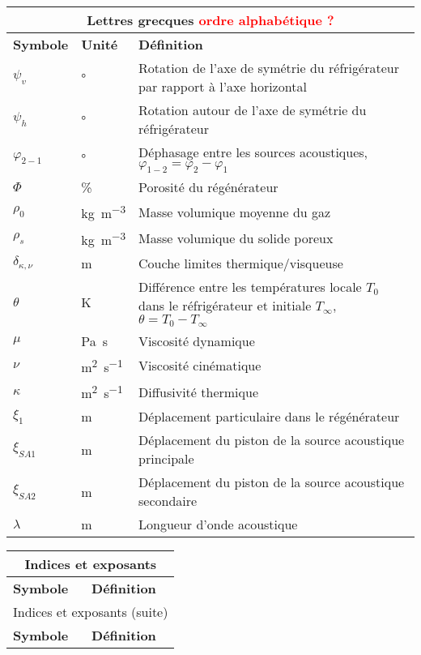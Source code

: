 \begin{center}
    \begin{longtable}{p{} @{} p{} @{} p{}}
        \multicolumn{3}{c}{Lettres grecques \textcolor{red}{ordre alphabétique ?}}  \\\hline
        \textbf{Symbole} & \textbf{Unité} & \textbf{Définition} \\\hline\hline
        $\psi_v$ & \unit{\degree} & Rotation de l'axe de symétrie du réfrigérateur par rapport à l'axe horizontal\\
        $\psi_h$ & \unit{\degree} & Rotation autour de l'axe de symétrie du réfrigérateur \\
        $\varphi_{2-1}$ & \unit{\degree} & Déphasage entre les sources acoustiques, $\varphi_{1-2} = \varphi_2 - \varphi_1$\\
        $\Phi$ & \unit{\percent} & Porosité du régénérateur \\
        $\rho_0$ & \unit{\kilo\gram\per\cubic\meter} & Masse volumique moyenne du gaz \\
        $\rho_{s}$ & \unit{\kilo\gram\per\cubic\meter} & Masse volumique du solide poreux\\
        $\delta_{\kappa,\nu}$ & \unit{\meter} & Couche limites thermique/visqueuse \\
        $\theta$ & \unit{\kelvin} & Différence entre les températures locale $T_0$ dans le réfrigérateur et initiale $T_\infty$, ${\theta=T_0-T_\infty}$\\
        $\mu$ & \unit{\pascal\second} & Viscosité dynamique \\
        $\nu$ & \unit{\square\meter\per\second} & Viscosité cinématique \\
        $\kappa$ & \unit{\square\meter\per\second} & Diffusivité thermique \\
        $\xi_1$ & \unit{\meter} & Déplacement particulaire dans le régénérateur \\
        $\xi_{SA1}$ & \unit{\meter} & Déplacement du piston de la source acoustique principale \\
        $\xi_{SA2}$ & \unit{\meter} & Déplacement du piston de la source acoustique secondaire \\
        $\lambda$ & \unit{\meter} & Longueur d'onde acoustique \\\hline
    \end{longtable}

\bigskip

    \begin{longtable}{p{} @{} p{}}
        \multicolumn{2}{c}{Indices et exposants}  \\\hline
        \textbf{Symbole} & \textbf{Définition} \\\hline\hline \endfirsthead
        \multicolumn{2}{c}{Indices et exposants (suite)}  \\\hline
        \textbf{Symbole} & \textbf{Définition} \\\hline\hline \endhead
		

\end{longtable}
\end{center}
